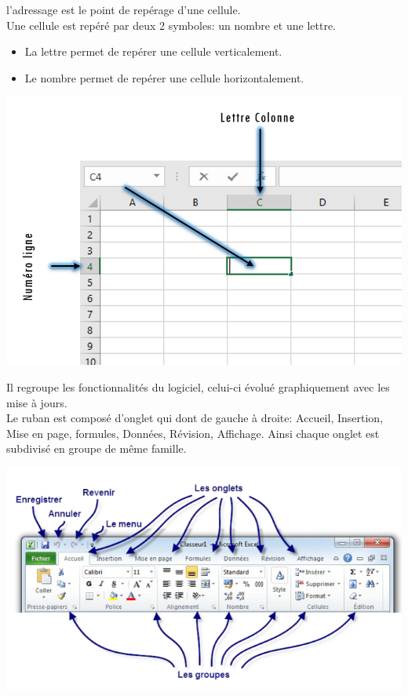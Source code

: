 \begin{definition}[Adressage]
l'adressage est le point de repérage d’une cellule.\\
Une cellule est repéré par deux 2 symboles:  un nombre et une lettre.
\begin{itemize}
	\item La lettre permet de repérer une cellule verticalement.
	\item Le nombre permet de repérer une cellule horizontalement. 
\end{itemize}
\begin{center} 
	\includegraphics[scale=0.2,width=\linewidth]{img/adressage} 
	 \label{rdp}
\end{center}
\end{definition}

\begin{definition}[Ruban]
	Il regroupe les fonctionnalités du logiciel, celui-ci évolué  graphiquement avec les mise à jours.\\
	Le ruban est composé d’onglet qui dont de gauche à droite: Accueil, Insertion, Mise en page, formules, Données, Révision, Affichage.
	Ainsi chaque onglet est subdivisé en groupe de même famille.
	\begin{center} 
		\includegraphics[scale=0.2,width=\linewidth]{img/ruban} 
		 \label{rdp}
	\end{center}
\end{definition}

